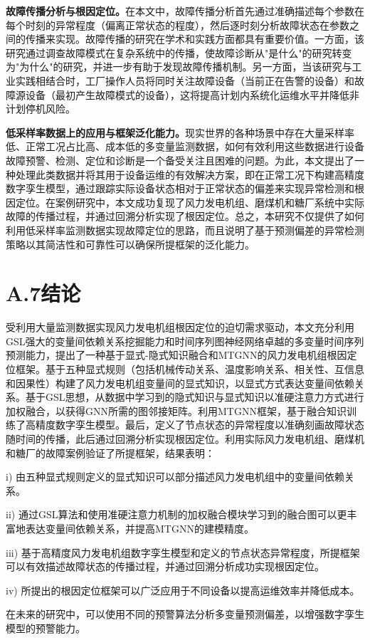 \textbf{故障传播分析与根因定位。}在本文中，故障传播分析首先通过准确描述每个参数在每个时刻的异常程度（偏离正常状态的程度），然后逐时刻分析故障状态在参数之间的传播来实现。故障传播的研究在学术和实践方面都具有重要价值。一方面，该研究通过调查故障模式在复杂系统中的传播，使故障诊断从"是什么"的研究转变为"为什么"的研究，并进一步有助于发现故障传播机制。另一方面，当该研究与工业实践相结合时，工厂操作人员将同时关注故障设备（当前正在告警的设备）和故障源设备（最初产生故障模式的设备），这将提高计划内系统化运维水平并降低非计划停机风险。

\textbf{低采样率数据上的应用与框架泛化能力。}现实世界的各种场景中存在大量采样率低、正常工况占比高、成本低的多变量监测数据，如何有效利用这些数据进行设备故障预警、检测、定位和诊断是一个备受关注且困难的问题。为此，本文提出了一种处理此类数据并将其用于设备运维的有效解决方案，即在正常工况下构建高精度数字孪生模型，通过跟踪实际设备状态相对于正常状态的偏差来实现异常检测和根因定位。在案例研究中，本文成功复现了风力发电机组、磨煤机和糖厂系统中实际故障的传播过程，并通过回溯分析实现了根因定位。总之，本研究不仅提供了如何利用低采样率监测数据实现故障定位的思路，而且说明了基于预测偏差的异常检测策略以其简洁性和可靠性可以确保所提框架的泛化能力。

\section*{A.7\quad 结论}

受利用大量监测数据实现风力发电机组根因定位的迫切需求驱动，本文充分利用GSL强大的变量间依赖关系挖掘能力和时间序列图神经网络卓越的多变量时间序列预测能力，提出了一种基于显式-隐式知识融合和MTGNN的风力发电机组根因定位框架。基于五种显式规则（包括机械传动关系、温度影响关系、相关性、互信息和因果性）构建了风力发电机组变量间的显式知识，以显式方式表达变量间依赖关系。基于GSL思想，从数据中学习到的隐式知识与显式知识以准硬注意力方式进行加权融合，以获得GNN所需的图邻接矩阵。利用MTGNN框架，基于融合知识训练了高精度数字孪生模型。最后，定义了节点状态的异常程度以准确刻画故障状态随时间的传播，此后通过回溯分析实现根因定位。利用实际风力发电机组、磨煤机和糖厂的故障案例验证了所提框架，结果表明：

i) 由五种显式规则定义的显式知识可以部分描述风力发电机组中的变量间依赖关系。

ii) 通过GSL算法和使用准硬注意力机制的加权融合模块学习到的融合图可以更丰富地表达变量间依赖关系，并提高MTGNN的建模精度。

iii) 基于高精度风力发电机组数字孪生模型和定义的节点状态异常程度，所提框架可以有效描述故障状态的传播过程，并通过回溯分析成功实现根因定位。

iv) 所提出的根因定位框架可以广泛应用于不同设备以提高运维效率并降低成本。

在未来的研究中，可以使用不同的预警算法分析多变量预测偏差，以增强数字孪生模型的预警能力。

